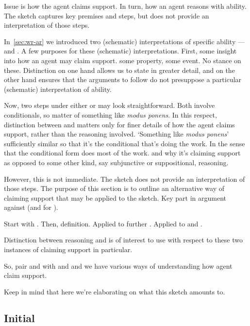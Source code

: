 \begin{note}
  Issue is how the agent claims support.
  In turn, how an agent reasons with ability.
  The sketch captures key premises and steps, but does not provide an interpretation of those steps.

  In~\autoref{sec:wr-ar} we introduced two (schematic) interpretations of specific ability --- \AR{} and \WR{}.
  A few purposes for these (schematic) interpretations.
  First, some insight into how an agent may claim support.
  \AR{} some property, \WR{} some event.
  No stance on these.
  Distinction on one hand allows us to state in greater detail, and on the other hand ensures that the arguments to follow do not presuppose a particular (schematic) interpretation of ability.

  Now, two steps under either \AR{} or \WR{} may look straightforward.
  Both involve conditionals, so matter of something like \emph{modus ponens}.
  In this respect, distinction between \AR{} and \WR{} matters only for finer details of how the agent claims support, rather than the reasoning involved.
  `Something like \emph{modus ponens}' sufficiently similar so that it's the conditional that's doing the work.
  In the sense that the conditional form does most of the work.
  \AR{} and \WR{} why it's claiming support as opposed to some other kind, say subjunctive or suppositional, reasoning.

  However, this is not immediate.
  The sketch does not provide an interpretation of those steps.
  The purpose of this section is to outline an alternative way of claiming support that may be applied to the sketch.
  Key part in argument against \ESU{} (and for \EAS{}).

  Start with .
  Then, definition.
  Applied to further .
  Applied to \AR{} and \WR{}.


  Distinction between reasoning \adA{} and \adB{} is of interest to use with respect to these two instances of claiming support in particular.

  So, pair \AR{} and \WR{} with \adA{} and \adB{} and we have various ways of understanding how agent claim support.

  Keep in mind that here we're elaborating on what this sketch amounts to.
\end{note}

\subsection{Initial }

